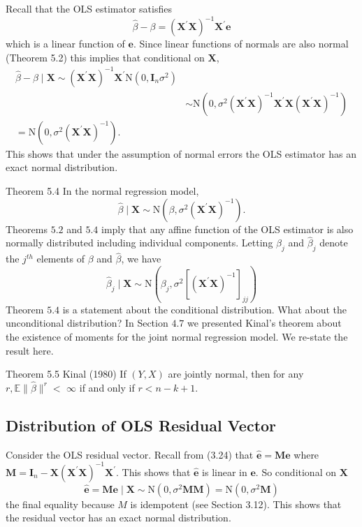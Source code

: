 \documentclass[10pt]{article}
\begin{document}
Recall that the OLS estimator satisfies
$$
\widehat{\beta}-\beta=\left(\boldsymbol{X}^{\prime} \boldsymbol{X}\right)^{-1} \boldsymbol{X}^{\prime} \boldsymbol{e}
$$
which is a linear function of $\boldsymbol{e}$. Since linear functions of normals are also normal (Theorem 5.2) this implies that conditional on $\boldsymbol{X}$,
$$
\begin{aligned}
\widehat{\beta}-\beta \mid \boldsymbol{X} \sim\left(\boldsymbol{X}^{\prime} \boldsymbol{X}\right)^{-1} \boldsymbol{X}^{\prime} \mathrm{N}\left(0, \boldsymbol{I}_{n} \sigma^{2}\right) \\
& \sim \mathrm{N}\left(0, \sigma^{2}\left(\boldsymbol{X}^{\prime} \boldsymbol{X}\right)^{-1} \boldsymbol{X}^{\prime} \boldsymbol{X}\left(\boldsymbol{X}^{\prime} \boldsymbol{X}\right)^{-1}\right) \\
=\mathrm{N}\left(0, \sigma^{2}\left(\boldsymbol{X}^{\prime} \boldsymbol{X}\right)^{-1}\right) .
\end{aligned}
$$
This shows that under the assumption of normal errors the OLS estimator has an exact normal distribution.

Theorem 5.4 In the normal regression model,
$$
\widehat{\beta} \mid \boldsymbol{X} \sim \mathrm{N}\left(\beta, \sigma^{2}\left(\boldsymbol{X}^{\prime} \boldsymbol{X}\right)^{-1}\right) .
$$
Theorems $5.2$ and $5.4$ imply that any affine function of the OLS estimator is also normally distributed including individual components. Letting $\beta_{j}$ and $\widehat{\beta}_{j}$ denote the $j^{t h}$ elements of $\beta$ and $\widehat{\beta}$, we have
$$
\widehat{\beta}_{j} \mid \boldsymbol{X} \sim \mathrm{N}\left(\beta_{j}, \sigma^{2}\left[\left(\boldsymbol{X}^{\prime} \boldsymbol{X}\right)^{-1}\right]_{j j}\right)
$$
Theorem $5.4$ is a statement about the conditional distribution. What about the unconditional distribution? In Section $4.7$ we presented Kinal's theorem about the existence of moments for the joint normal regression model. We re-state the result here.

Theorem 5.5 Kinal (1980) If $(Y, X)$ are jointly normal, then for any $r, \mathbb{E}\|\widehat{\beta}\|^{r}<$ $\infty$ if and only if $r<n-k+1$.

\subsection{Distribution of OLS Residual Vector}
Consider the OLS residual vector. Recall from (3.24) that $\widehat{\boldsymbol{e}}=\boldsymbol{M} \boldsymbol{e}$ where $\boldsymbol{M}=\boldsymbol{I}_{n}-\boldsymbol{X}\left(\boldsymbol{X}^{\prime} \boldsymbol{X}\right)^{-1} \boldsymbol{X}^{\prime}$. This shows that $\widehat{\boldsymbol{e}}$ is linear in $\boldsymbol{e}$. So conditional on $\boldsymbol{X}$
$$
\widehat{\boldsymbol{e}}=\boldsymbol{M} \boldsymbol{e} \mid \boldsymbol{X} \sim \mathrm{N}\left(0, \sigma^{2} \boldsymbol{M} \boldsymbol{M}\right)=\mathrm{N}\left(0, \sigma^{2} \boldsymbol{M}\right)
$$
the final equality because $M$ is idempotent (see Section 3.12). This shows that the residual vector has an exact normal distribution.
\end{document}
